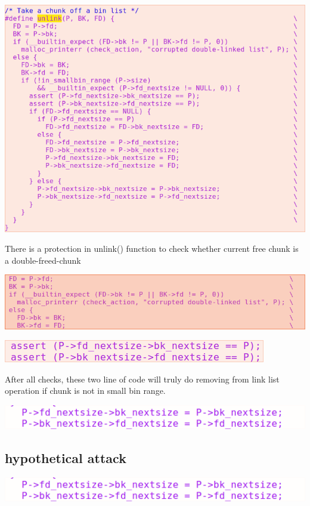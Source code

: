 \documentclass[12pt]{article}
\begin{document}
\includegraphics[scale=0.5]{unlink.png}

There is a protection in unlink() function to check whether current free chunk is a double-freed-chunk 

\includegraphics[scale=0.5]{unlink_double_free_check1.png}

\includegraphics[scale=0.5]{unlink_double_free_check2.png}

After all checks, these two line of code will truly do removing from link list operation if chunk is not in small bin range.   

\includegraphics[scale=0.5]{rm_linklist.png}

\subsection{hypothetical attack}

\includegraphics[scale=0.5]{rm_linklist.png}
\end{document}
